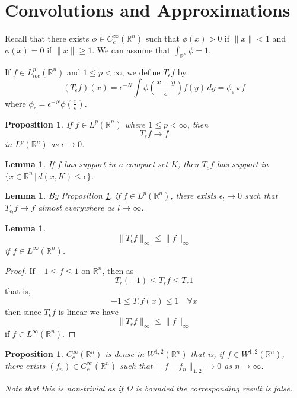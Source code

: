 \documentclass[10pt, oneside, reqno]{amsart}
\theoremstyle{plain}%
\newtheorem{lem}[thm]{Lemma}
\newtheorem{prop}[thm]{Proposition}
\numberwithin{equation}{section}
\theoremstyle{definition}
\theoremstyle{remark}
\newcommand{\given}{ \, | \,}
\newcommand{\R}{\mathbb{R}}
\begin{document}
\section{Convolutions and Approximations} %
\label{sec:convolutions_and_approximations}
Recall that there exists $\phi  \in C^\infty_c(\R^n)$ such that $\phi(x) > 0$ if $\| x \| < 1$ and $\phi(x) = 0$ if $\| x \| \geq 1$.  We can assume that $\int_{\R^n} \phi = 1$.

If $f \in L^p_{loc}(\R^n)$ and $1 \leq p < \infty$, we define $T_\epsilon f$ by \[
	(T_\epsilon f)(x) = \epsilon^{-N} \int \phi \left( \frac{x-y}{\epsilon} \right) f(y) \, dy = \phi_\epsilon \star f
\] where $\phi_\epsilon = \epsilon^{-N} \phi\left( \frac{x}{\epsilon}\right)$.


\begin{prop}
	\label{prop:convergence_of_covolution}
	If $f \in L^p(\R^n)$ where $1 \leq p < \infty$, then \[
		T_\epsilon f \rightarrow f
	\] in $L^p(\R^n)$ as $\epsilon \rightarrow 0$.  
\end{prop}  

\begin{lem}
	If $f$ has support in a compact set $K$, then $T_e f$ has support in $\{ x \in \R^n \given d(x, K) \leq \epsilon \}$. 
\end{lem}

\begin{lem}
	By Proposition \ref{prop:convergence_of_covolution}, if $f \in L^p(\R^n)$, there exists $\epsilon_l \rightarrow 0$ such that $T_{\epsilon_l} f \rightarrow f$ almost everywhere as $l \rightarrow \infty$.
\end{lem}

\begin{lem}
	 \[
		\| T_\epsilon f \|_{\infty} \leq \| f \|_\infty
	\] if $f \in L^\infty(\R^n)$.
\end{lem}

\begin{proof}
	If $-1 \leq f \leq 1$ on $\R^n$, then as \[
		T_\epsilon(-1) \leq T_\epsilon f \leq T_\epsilon 1
	\] that is, \[
		-1 \leq T_\epsilon f(x) \leq 1 \quad \forall x
	\] then since $T_\epsilon f$ is linear we have \[
		\| T_\epsilon f \|_{\infty} \leq \| f \|_\infty
	\] if $f \in L^\infty(\R^n)$.
\end{proof}

\begin{prop}
	$C_c^\infty(\R^n)$ is dense in $W^{1, 2}(\R^n)$ that is, if $f \in W^{1, 2}(\R^n)$, there exists $(f_n) \in C^\infty_c(\R^n)$ such that $\| f - f_n \|_{1, 2} \rightarrow 0$ as $n \rightarrow \infty$. 
	
	Note that this is non-trivial as if $\Omega$ is bounded the corresponding result is false.
\end{prop}
\end{document}
